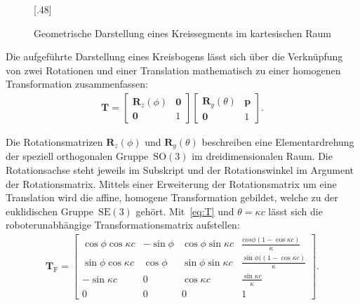 \begin{figure}[hbt!]
\centering
{}[.48\linewidth]
{}
\label{fig:bogengeometrie}
{}
\caption[Geometrische Darstellung eines Kreissegments im kartesischen Raum]{Geometrische Darstellung eines Kreissegments im kartesischen Raum}
\label{fig:bogenparameter}
\end{figure}

Die aufgeführte Darstellung eines Kreisbogens lässt sich über die Verknüpfung von zwei Rotationen und einer Translation mathematisch zu einer homogenen Transformation zusammenfassen:
\begin{align}
\bm{T} = 
\begin{bmatrix}
\bm{R}_z(\phi) & \bm{0} \\
\bm{0} & 1
\end{bmatrix}
\begin{bmatrix}
\bm{R}_y(\theta) & \bm{p} \\
\bm{0} & 1
\end{bmatrix}.
\label{eq:T}
\end{align}

Die Rotationsmatrizen $\bm{R}_z(\phi)$ und $\bm{R}_y(\theta)$ beschreiben eine Elementardrehung der speziell orthogonalen Gruppe~$\mathrm{SO}(3)$ im dreidimensionalen Raum. Die Rotationsachse steht jeweils im Subskript und der Rotationswinkel im Argument der Rotationsmatrix. Mittels einer Erweiterung der Rotationsmatrix um eine Translation wird die affine, homogene Transformation gebildet, welche zu der euklidischen Gruppe~$\mathrm{SE}(3)$ gehört. Mit~\eqref{eq:T} und $\theta=\kappa c$ lässt sich die roboterunabhängige Transformationsmatrix aufstellen:
\begin{align}
\bm{T}_\mathrm{F} = 
\begin{bmatrix}
\cos\phi \cos\kappa c & -\sin\phi & \cos\phi \sin\kappa c & \frac{cos\phi (1-\cos\kappa c)}{\kappa} \\
\sin\phi \cos\kappa c & \cos\phi & \sin\phi \sin\kappa c & \frac{\sin\phi( (1-\cos\kappa c)}{\kappa} \\
-\sin\kappa c &  0 & \cos\kappa c & \frac{\sin\kappa c}{\kappa} \\
0 & 0 & 0 & 1
\end{bmatrix}.
\label{eq:T_frenet}
\end{align}

